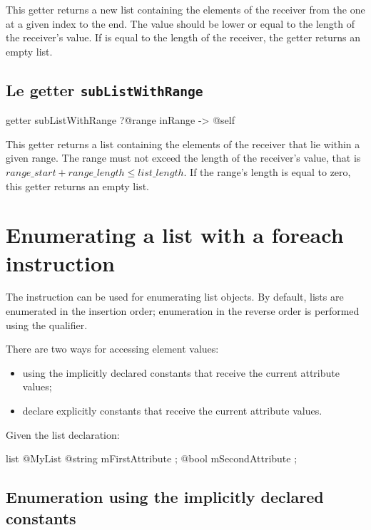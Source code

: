This getter returns a new list containing the elements of the receiver from the one at a given index to the end. The   value should be lower or equal to the length of the receiver's value. If  is equal to the length of the receiver, the getter returns an empty list.


\subsection{Le getter \texttt{subListWithRange}}

\begin{galgascode}
getter subListWithRange
  ?@range inRange
  -> @self
\end{galgascode}

This getter returns a list containing the elements of the receiver that lie within a given range. The range must not exceed the length of the receiver's value, that is $range\_start + range\_length \leqslant list\_length$. If the range's length is equal to zero, this getter returns an empty list.





\section{Enumerating a list with a foreach instruction}

The  instruction can be used for enumerating list objects. By default, lists are enumerated in the insertion order; enumeration in the reverse order is performed using the \galgas{>} qualifier.

There are two ways for accessing element values:
\begin{itemize}
\item using the implicitly declared constants that receive the current attribute values;
\item declare explicitly constants that receive the current attribute values.
\end{itemize}

Given the list declaration:

\begin{galgascode}
list @MyList {
  @string mFirstAttribute ;
  @bool mSecondAttribute ;
}
\end{galgascode}

\subsection{Enumeration using the implicitly declared constants}

